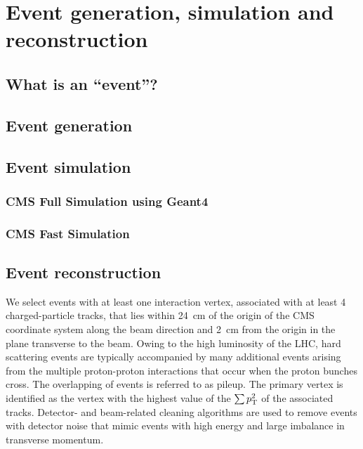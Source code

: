 \chapter{Event generation, simulation and reconstruction \label{chap:event_generation}}

\section{What is an ``event''? \label{sec:event}}


\section{Event generation \label{sec:event_generation}}


\section{Event simulation \label{sec:event_simulation}}

\subsection{CMS Full Simulation using Geant4 \label{subsec:fullsim}}


\subsection{CMS Fast Simulation \label{subsec:fastsim}}


\section{Event reconstruction \label{sec:event_reconstruction}}


We select events with at least one interaction vertex, associated with at least 4 charged-particle
tracks, that lies within 24~cm of the origin of the CMS coordinate system along the beam direction
and 2~cm from the origin in the plane transverse to the beam. Owing to the high luminosity of the
LHC, hard scattering events are typically accompanied by many additional events arising from the
multiple proton-proton interactions that occur when the proton bunches cross.  The overlapping of
events is referred to as pileup.  The primary vertex is identified as the vertex with the highest
value of the $\sum p_{\mathrm{T}}^2$ of the associated tracks.  Detector- and beam-related cleaning algorithms
are used to remove events with detector noise that mimic events with high energy and large imbalance
in transverse momentum.  


